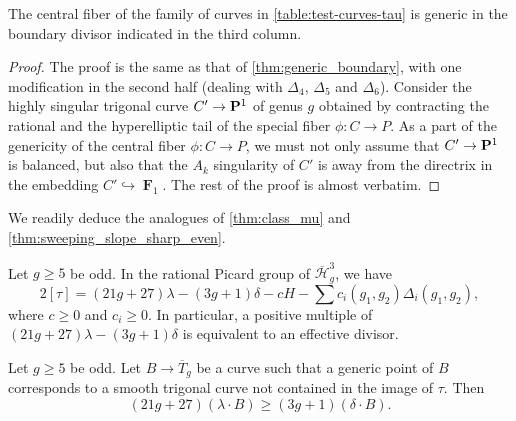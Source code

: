 \documentclass{amsart}
\renewcommand {\P}{{\bf P}}
\newcommand {\from}{{\colon}}
\newcommand{\into}{{\hookrightarrow}}
\newcommand{\orb}[1]{{\mathcal #1}}     %
\renewcommand {\o}[1]{\overline{#1}}
\DeclareMathOperator{\F}{\mathbf F}
\renewcommand{\o}{\overline}
\begin{document}
\begin{proposition}
  The central fiber of the family of curves in
  \autoref{table:test-curves-tau} is generic in the boundary divisor
  indicated in the third column.
\end{proposition}
\begin{proof}
  The proof is the same as that of \autoref{thm:generic_boundary},
  with one modification in the second half (dealing with $\Delta_4$,
  $\Delta_5$ and $\Delta_6$). Consider the highly singular trigonal
  curve $C' \to \P^1$ of genus $g$ obtained by contracting the
  rational and the hyperelliptic tail of the special fiber $\phi \from
  C \to P$. As a part of the genericity of the central fiber $\phi
  \from C \to P$, we must not only assume that $C' \to \P^1$ is
  balanced, but also that the $A_k$ singularity of $C'$ is away from
  the directrix in the embedding $C' \into \F_1$. The rest of the proof
  is almost verbatim.
\end{proof}

We readily deduce the analogues of \autoref{thm:class_mu} and \autoref{thm:sweeping_slope_sharp_even}.
\begin{proposition}\label{thm:class_tau}
  Let $g \geq 5$ be odd. In the rational Picard group of $\o{\orb H}_g^3$, we have
  \[ 2[\tau] = (21g+27)\lambda - (3g+1)\delta - cH -\sum c_i(g_1,g_2)\Delta_i(g_1,g_2),\]
  where $c \geq 0$ and $c_i \geq 0$. In particular, a positive multiple of $(21g+27)\lambda - (3g+1)\delta$ is equivalent to an effective divisor.
\end{proposition}
\begin{corollary}\label{thm:sweeping_slope_sharp_odd}
  Let $g \geq 5$ be odd. Let $B \to \o T_g$ be a curve such that a
  generic point of $B$ corresponds to a smooth trigonal curve not
  contained in the image of $\tau$. Then
  \[ (21g+27) (\lambda \cdot B) \geq (3g+1) (\delta \cdot B).\]
\end{corollary}
\end{document}
